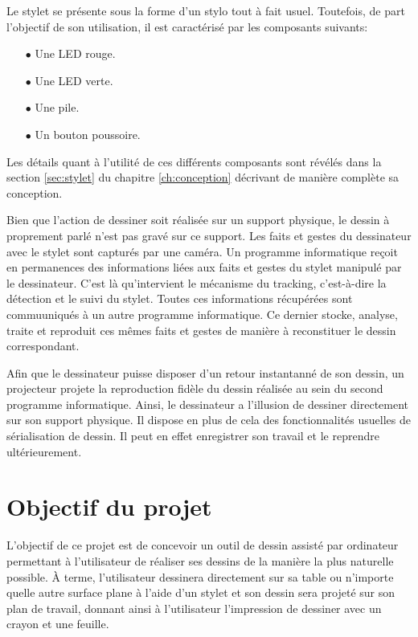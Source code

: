 \documentclass[11pt,a4paper,oldfontcommands]{memoir}
\begin{document}
Le stylet se présente sous la forme d'un stylo tout à fait usuel. Toutefois, de part l'objectif de son utilisation, il est caractérisé par les composants suivants:

\begin{itemize}
\item[$\bullet$] Une LED rouge.
\item[$\bullet$] Une LED verte.
\item[$\bullet$] Une pile.
\item[$\bullet$] Un bouton poussoire.
\end{itemize}

Les détails quant à l'utilité de ces différents composants sont révélés dans la section \ref{sec:stylet} du chapitre \ref{ch:conception} décrivant de manière complète sa conception.

Bien que l'action de dessiner soit réalisée sur un support physique, le dessin à proprement parlé n'est pas gravé sur ce support. Les faits et gestes du dessinateur avec le stylet sont capturés par une caméra. Un programme informatique reçoit en permanences des informations liées aux faits et gestes du stylet manipulé par le dessinateur. C'est là qu'intervient le mécanisme du tracking, c'est-à-dire la détection et le suivi du stylet. Toutes ces informations récupérées sont commuuniqués à un autre programme informatique. Ce dernier stocke, analyse, traite et reproduit ces mêmes faits et gestes de manière à reconstituer le dessin correspondant.

Afin que le dessinateur puisse disposer d'un retour instantanné de son dessin, un projecteur projete la reproduction fidèle du dessin réalisée au sein du second programme informatique. Ainsi, le dessinateur a l'illusion de dessiner directement sur son support physique. Il dispose en plus de cela des fonctionnalités usuelles de sérialisation de dessin. Il peut en effet enregistrer son travail et le reprendre ultérieurement.

\section{Objectif du projet}

L'objectif de ce projet est de concevoir un outil de dessin assisté par ordinateur permettant à l'utilisateur de réaliser ses dessins de la manière la plus naturelle possible. À terme, l'utilisateur dessinera directement sur sa table ou n'importe quelle autre surface plane à l'aide d'un stylet et son dessin sera projeté sur son plan de travail, donnant ainsi à l'utilisateur l'impression de dessiner avec un crayon et une feuille.
\end{document}
